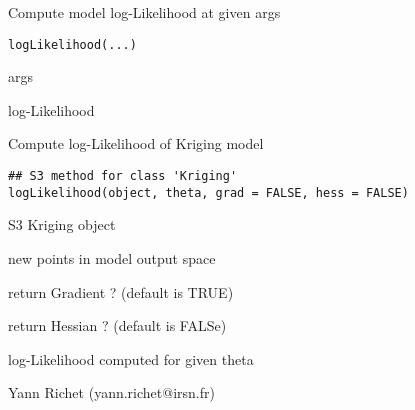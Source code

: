 \documentclass[letterpaper]{book}
\begin{document}
%
\begin{Description}\relax
Compute model log-Likelihood at given args
\end{Description}
%
\begin{Usage}
\begin{verbatim}
logLikelihood(...)
\end{verbatim}
\end{Usage}
%
\begin{Arguments}
\begin{ldescription}
\item[\code{...}] args
\end{ldescription}
\end{Arguments}
%
\begin{Value}
log-Likelihood
\end{Value}
%
\begin{Description}\relax
Compute log-Likelihood of Kriging model
\end{Description}
%
\begin{Usage}
\begin{verbatim}
## S3 method for class 'Kriging'
logLikelihood(object, theta, grad = FALSE, hess = FALSE)
\end{verbatim}
\end{Usage}
%
\begin{Arguments}
\begin{ldescription}
\item[\code{object}] S3 Kriging object

\item[\code{theta}] new points in model output space

\item[\code{grad}] return Gradient ? (default is TRUE)

\item[\code{hess}] return Hessian ? (default is FALSe)
\end{ldescription}
\end{Arguments}
%
\begin{Value}
log-Likelihood computed for given theta
\end{Value}
%
\begin{Author}\relax
Yann Richet (yann.richet@irsn.fr)
\end{Author}
\end{document}
